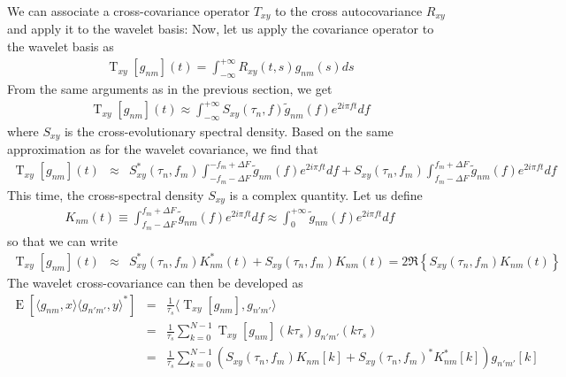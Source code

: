 \documentclass{article}
\begin{document}
We can associate a cross-covariance operator $T_{xy}$ to the cross autocovariance $R_{xy}$ and apply it to the wavelet basis:
Now, let us apply the covariance operator to the wavelet basis as
\begin{eqnarray}
\label{eq:cross-covariance-operator-applied-to-wavelet}
    \operatorname{T}_{xy}[g_{nm}](t) = \int_{-\infty}^{+\infty} R_{xy}(t, s) g_{nm}(s) ds
\end{eqnarray}
From the same arguments as in the previous section, we get 
\begin{eqnarray}
    \operatorname{T}_{xy}[g_{nm}](t) \approx \int_{-\infty}^{+\infty} S_{xy}(\tau_n, f) \tilde{g}_{nm}(f) e^{2i\pi f t}df
\end{eqnarray}
where $S_{xy}$ is the cross-evolutionary spectral density.
Based on the same approximation as for the wavelet covariance, we find that
\begin{eqnarray}
    \operatorname{T}_{xy}[g_{nm}](t) & \approx & S_{xy}^{\ast}(\tau_n, f_m)  \int_{-f_m -\Delta F}^{-f_m +\Delta F}\tilde{g}_{nm}(f) e^{2 i \pi f t}  df + S_{xy}(\tau_n, f_m)  \int_{f_m -\Delta F}^{f_m +\Delta F}\tilde{g}_{nm}(f) e^{2 i \pi f t}  df \nonumber
\end{eqnarray}
This time, the cross-spectral density $S_{xy}$ is a complex quantity.
Let us define
\begin{eqnarray}
    K_{nm}(t) \equiv \int_{f_m -\Delta F}^{f_m +\Delta F}\tilde{g}_{nm}(f) e^{2 i \pi f t}  df \approx \int_{0}^{+\infty}\tilde{g}_{nm}(f) e^{2 i \pi f t}  df 
\end{eqnarray}
so that we can write
\begin{eqnarray}
    \operatorname{T}_{xy}[g_{nm}](t) & \approx & S_{xy}^{\ast}(\tau_n, f_m)  K_{nm}^{\ast}(t) + S_{xy}(\tau_n, f_m)  K_{nm}(t) = 2 \Re\left\{ S_{xy}(\tau_n, f_m)  K_{nm}(t) \right\} \nonumber
\end{eqnarray}
The wavelet cross-covariance can then be developed as
\begin{eqnarray}
\label{eq:cross_cov_operator_property-applied}
\operatorname{E}\left[ \langle g_{nm} , x \rangle \langle g_{n'm'}, y \rangle^{\ast} \right]     & = & \frac{1}{\tau_s} \langle \operatorname{T}_{xy}[g_{nm}], g_{n'm'} \rangle \nonumber \\
    & = & \frac{1}{\tau_s} \sum_{k=0}^{N-1} \operatorname{T}_{xy}[g_{nm}](k \tau_s) g_{n'm'}(k \tau_s) \nonumber \\
    & = & \frac{1}{\tau_s} \sum_{k=0}^{N-1} \left( S_{xy}(\tau_n, f_m) K_{nm}[k] + S_{xy}(\tau_n, f_m)^{\ast} K_{nm}^{\ast}[k] \right) g_{n'm'}[k] \nonumber
\end{eqnarray}
\end{document}

